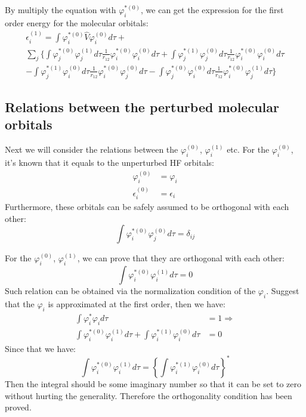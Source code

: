 By multiply the equation with $\varphi^{*(0)}_{i}$, we can get the
expression for the first order energy for the molecular orbitals:
\begin{multline}\label{PTIMQMeq:13}
\epsilon^{(1)}_{i}=
\int\varphi^{*(0)}_{i}\hat{V}\varphi^{(0)}_{i}d\tau + \\
\sum_{j}\Bigg\{
\int\varphi^{*(0)}_{j}\varphi^{(1)}_{j}d\tau\frac{1}{r_{12}}
    \varphi^{*(0)}_{i}\varphi^{(0)}_{i}d\tau +
\int\varphi^{*(1)}_{j}\varphi^{(0)}_{j}d\tau\frac{1}{r_{12}}
    \varphi^{*(0)}_{i}\varphi^{(0)}_{i}d\tau
\\
-
\int\varphi^{*(1)}_{j}\varphi^{(0)}_{i}d\tau\frac{1}{r_{12}}
    \varphi^{*(0)}_{i}\varphi^{(0)}_{j}d\tau
-
\int\varphi^{*(0)}_{j}\varphi^{(0)}_{i}d\tau\frac{1}{r_{12}}
    \varphi^{*(0)}_{i}\varphi^{(1)}_{j}d\tau
\Bigg\}
\end{multline}


\subsection{Relations between the perturbed molecular
orbitals}\label{PTIMQM:1}
%
%
Next we will consider the relations between the $\varphi^{(0)}_{i}$,
$\varphi^{(1)}_{i}$ etc. For the $\varphi^{(0)}_{i}$, it's known
that it equals to the unperturbed HF orbitals:
\begin{align}\label{}
\varphi^{(0)}_{i} &= \varphi_{i}  \nonumber \\
\epsilon^{(0)}_{i} &= \epsilon_{i}
\end{align}
Furthermore, these orbitals can be safely assumed to be orthogonal
with each other:
\begin{equation}\label{}
\int \varphi^{*(0)}_{i}\varphi^{(0)}_{j} d\tau = \delta_{ij}
\end{equation}

For the $\varphi^{(0)}_{i}$, $\varphi^{(1)}_{i}$, we can prove that
they are orthogonal with each other:
\begin{equation}\label{PTIMQMeq:19}
\int \varphi^{*(0)}_{i}\varphi^{(1)}_{i} d\tau = 0
\end{equation}
Such relation can be obtained via the normalization condition of the
$\varphi_{i}$. Suggest that the $\varphi_{i}$ is approximated at the
first order, then we have:
\begin{align}\label{}
\int \varphi^{*}_{i}\varphi_{i} d\tau &= 1  \Rightarrow \nonumber \\
\int \varphi^{*(0)}_{i}\varphi^{(1)}_{i} d\tau  + \int
\varphi^{*(1)}_{i}\varphi^{(0)}_{i} d\tau &= 0
\end{align}
Since that we have:
\begin{equation}\label{}
\int \varphi^{*(0)}_{i}\varphi^{(1)}_{i} d\tau  = \left\{\int
\varphi^{*(1)}_{i}\varphi^{(0)}_{i} d\tau\right\}^{*}
\end{equation}
Then the integral should be some imaginary number so that it can be
set to zero without hurting the generality. Therefore the
orthogonality condition has been proved.

